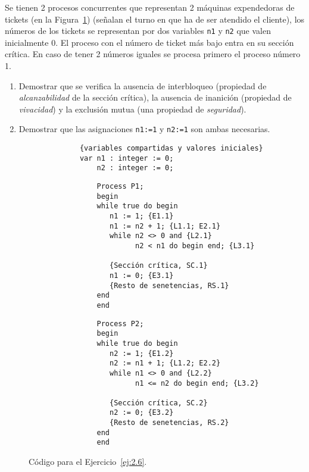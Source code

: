 \begin{ejercicio}\label{ej:2.6}
    Se tienen 2 procesos concurrentes que representan 2 máquinas expendedoras de tickets (en la Figura~\ref{fig:cod_6}) (señalan el turno en que ha de ser atendido el cliente), los números de los tickets se representan por dos variables \verb|n1| y \verb|n2| que valen inicialmente 0. El proceso con el número de ticket más bajo entra en su sección crítica. En caso de tener 2 números iguales se procesa primero el proceso número 1.
    \begin{enumerate}[label=(\alph*)]
        \item Demostrar que se verifica la ausencia de interbloqueo (propiedad de \textit{alcanzabilidad} de la sección crítica), la ausencia de inanición (propiedad de \textit{vivacidad}) y la exclusión mutua (una propiedad de \textit{seguridad}).
        \item Demostrar que las asignaciones \verb|n1:=1| y \verb|n2:=1| son ambas necesarias.
    \end{enumerate}

    \begin{figure}[H]
        \centering
        \begin{verbatim}
            {variables compartidas y valores iniciales}
            var n1 : integer := 0;
                n2 : integer := 0;
        \end{verbatim}
        \setlength{\columnsep}{1cm}
        \begin{multicols}{2}
            \begin{verbatim}
                Process P1;
                begin
                while true do begin
                   n1 := 1; {E1.1}
                   n1 := n2 + 1; {L1.1; E2.1}
                   while n2 <> 0 and {L2.1}
                         n2 < n1 do begin end; {L3.1}

                   {Sección crítica, SC.1}
                   n1 := 0; {E3.1}
                   {Resto de senetencias, RS.1}
                end
                end
            \end{verbatim}
            \begin{verbatim}
                Process P2;
                begin
                while true do begin
                   n2 := 1; {E1.2}
                   n2 := n1 + 1; {L1.2; E2.2}
                   while n1 <> 0 and {L2.2}
                         n1 <= n2 do begin end; {L3.2}

                   {Sección crítica, SC.2}
                   n2 := 0; {E3.2}
                   {Resto de senetencias, RS.2}
                end
                end
            \end{verbatim}
        \end{multicols}
        \caption{Código para el Ejercicio~\ref{ej:2.6}.}
        \label{fig:cod_6}
    \end{figure}


\end{ejercicio}
